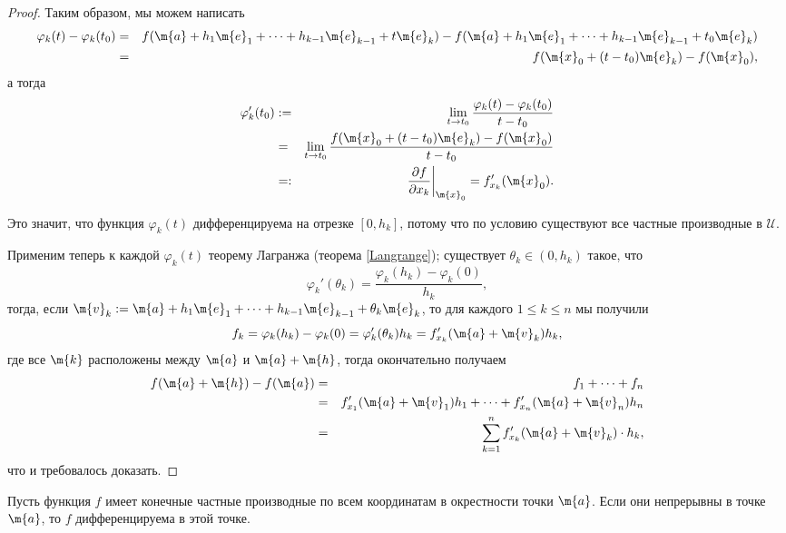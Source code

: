 \begin{proof}
Таким образом, мы можем написать
\begin{eqnarray*}
    \varphi_k(t) - \varphi_k(t_0) &=&  f(\m{a} + h_1 \m{e}_1 + \cdots + h_{k-1}\m{e}_{k-1} + t\m{e}_k) - f(\m{a} + h_1 \m{e}_1 + \cdots + h_{k-1}\m{e}_{k-1} + t_0\m{e}_k) \\
    &=& f(\m{x}_0 + (t-t_0) \m{e}_k) - f(\m{x}_0),
\end{eqnarray*}
а тогда
\begin{eqnarray*}
    \varphi_k'(t_0) &:=& \lim_{t \to t_0} \frac{\varphi_k(t) - \varphi_k(t_0)}{t-t_0} \\
    &=& \lim_{t \to t_0} \frac{f(\m{x}_0 + (t-t_0) \m{e}_k) - f(\m{x}_0)}{t-t_0} \\
    &=:& \left.\frac{\partial f}{\partial x_k}\right|_{\m{x}_0} = f'_{x_k}(\m{x}_0).
\end{eqnarray*}

Это значит, что функция $\varphi_k(t)$ дифференцируема на отрезке $[0,h_k]$, потому что по условию существуют все частные производные в $\mathscr{U}$. 

Применим теперь к каждой $\varphi_k(t)$ теорему Лагранжа (теорема \ref{Langrange}); существует $\theta_k \in (0, h_k)$ такое, что
\[
 \varphi_k'(\theta_k) = \frac{\varphi_k(h_k) - \varphi_k(0)}{h_k}, 
\]
тогда, если $\m{v}_k:= \m{a}+ h_1 \m{e}_1  + \cdots + h_{k-1}\m{e}_{k-1} + \theta_k\m{e}_k$, то для каждого $1\le k \le n$ мы получили
\[
 f_k = \varphi_k(h_k) - \varphi_k(0) = \varphi_k'(\theta_k)h_k = f'_{x_k}(\m{a} + \m{v}_k)h_k, 
\]
где все $\m{k}$ расположены между $\m{a}$ и $\m{a}+ \m{h}$, тогда окончательно получаем
\begin{eqnarray*}
    f(\m{a} + \m{h}) - f(\m{a}) &=& f_1 + \cdots + f_n \\
    &=& f'_{x_1}(\m{a} + \m{v}_1)h_1 + \cdots + f'_{x_n}(\m{a} + \m{v}_n)h_n \\
    &=& \sum_{k =1}^n f'_{x_k}({\m{a} + \m{v}_k}) \cdot h_k,
\end{eqnarray*}
что и требовалось доказать.
\end{proof}




\begin{theorem}
    Пусть функция $f$ имеет конечные частные производные по всем координатам в окрестности точки $\m{a}$. Если они непрерывны в точке $\m{a}$, то $f$ дифференцируема в этой точке.
\end{theorem}

